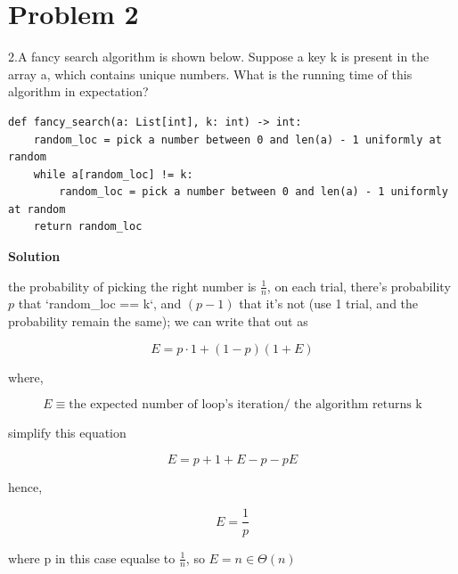 \documentclass{article}
\newcommand{\solution}{\textbf{\large Solution}}
\theoremstyle{remark}
\begin{document}
\vspace{1em}
\hrulefill

\section*{Problem 2}

2.A fancy search algorithm is shown below. Suppose a key k is present in the array a, which contains unique numbers. What is the running time of this algorithm in expectation?

\begin{verbatim}
def fancy_search(a: List[int], k: int) -> int:
    random_loc = pick a number between 0 and len(a) - 1 uniformly at random
    while a[random_loc] != k:
        random_loc = pick a number between 0 and len(a) - 1 uniformly at random
    return random_loc
\end{verbatim}

\medskip
\solution

the probability of picking the right number is $\frac{1}{n}$, on each trial, there's probability $p$ that `random\_loc == k`, and $(p-1)$ that it's not (use 1 trial, and the probability remain the same); we can write that out as

\[E = p\cdot1 + (1-p)(1+E)\]

where,

\[E \equiv \text{the expected number of loop's iteration/ the algorithm returns k}\]

simplify this equation

\[E = p + 1 + E - p -pE\]

hence, 

\[E = \frac{1}{p}\]

where p in this case equalse to $\frac{1}{n}$, so $E = n \in \boxed{\Theta(n)}$
\end{document}
